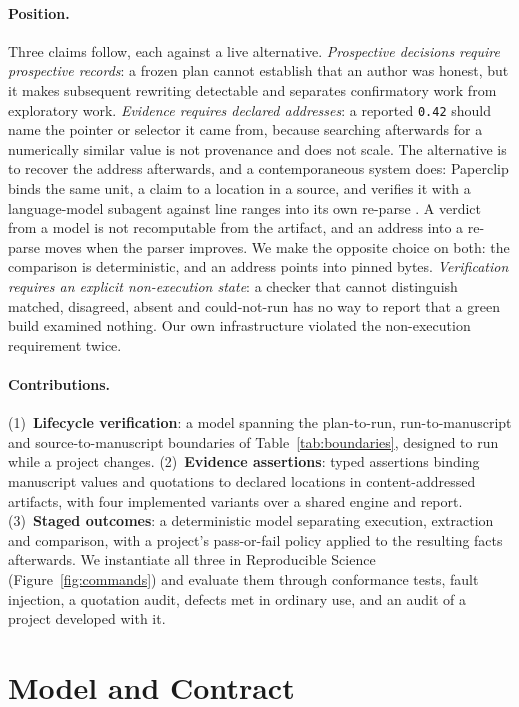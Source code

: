 \documentclass{article}
\newcommand{\code}[1]{\texttt{#1}}
\begin{document}
\paragraph{Position.} Three claims follow, each against a live alternative. \emph{Prospective decisions
require prospective records}: a frozen plan cannot establish that an author was honest, but it
makes subsequent rewriting detectable and separates confirmatory work from exploratory work.
\emph{Evidence requires declared addresses}: a reported \code{0.42} should name the pointer or
selector it came from, because searching afterwards for a numerically similar value is not
provenance and does not scale. The alternative is to recover the address afterwards, and a contemporaneous system does:
Paperclip binds the same unit, a claim to a location in a source, and verifies it with a
language-model subagent against line ranges into its own re-parse \citep{gxl2026paperclip}. A
verdict from a model is not recomputable from the artifact, and an address into a re-parse moves
when the parser improves. We make the opposite choice on both: the comparison is deterministic,
and an address points into pinned bytes. \emph{Verification requires an explicit non-execution state}: a
checker that cannot distinguish matched, disagreed, absent and could-not-run has no way to report
that a green build examined nothing. Our own infrastructure violated the non-execution
requirement twice.

\paragraph{Contributions.} (1)~\textbf{Lifecycle verification}: a model spanning the
plan-to-run, run-to-manuscript and source-to-manuscript boundaries of Table~\ref{tab:boundaries},
designed to run while a project changes. (2)~\textbf{Evidence assertions}: typed assertions binding
manuscript values and quotations to declared locations in content-addressed artifacts, with four
implemented variants over a shared engine and report. (3)~\textbf{Staged outcomes}: a deterministic
model separating execution, extraction and comparison, with a project's pass-or-fail policy applied
to the resulting facts afterwards. We instantiate all three in Reproducible Science (Figure~\ref{fig:commands}) and
evaluate them through conformance tests, fault injection, a quotation audit,
defects met in ordinary use, and an audit of a project developed with it.


\section{Model and Contract}
\label{sec:construction}
\end{document}
